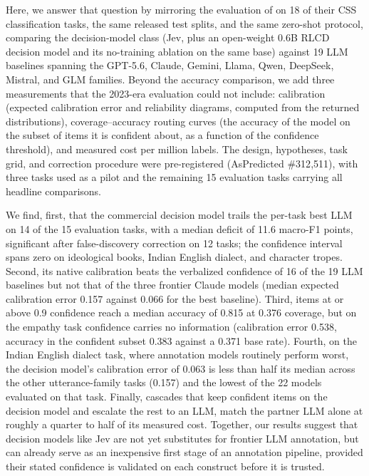 \documentclass[11pt]{article}
\begin{document}
Here, we answer that question by mirroring the evaluation of \citet{ziems2024llms} on 18 of their CSS classification tasks, the same released test splits, and the same zero-shot protocol, comparing the decision-model class (Jev, plus an open-weight 0.6B RLCD decision model and its no-training ablation on the same base) against 19 LLM baselines spanning the GPT-5.6, Claude, Gemini, Llama, Qwen, DeepSeek, Mistral, and GLM families. Beyond the accuracy comparison, we add three measurements that the 2023-era evaluation could not include: calibration (expected calibration error and reliability diagrams, computed from the returned distributions), coverage--accuracy routing curves (the accuracy of the model on the subset of items it is confident about, as a function of the confidence threshold), and measured cost per million labels. The design, hypotheses, task grid, and correction procedure were pre-registered (AsPredicted \#312{,}511), with three tasks used as a pilot and the remaining 15 evaluation tasks carrying all headline comparisons.

We find, first, that the commercial decision model trails the per-task best LLM on 14 of the 15 evaluation tasks, with a median deficit of 11.6 macro-F1 points, significant after false-discovery correction on 12 tasks; the confidence interval spans zero on ideological books, Indian English dialect, and character tropes. Second, its native calibration beats the verbalized confidence of 16 of the 19 LLM baselines but not that of the three frontier Claude models (median expected calibration error 0.157 against 0.066 for the best baseline). Third, items at or above 0.9 confidence reach a median accuracy of 0.815 at 0.376 coverage, but on the empathy task confidence carries no information (calibration error 0.538, accuracy in the confident subset 0.383 against a 0.371 base rate). Fourth, on the Indian English dialect task, where annotation models routinely perform worst, the decision model's calibration error of 0.063 is less than half its median across the other utterance-family tasks (0.157) and the lowest of the 22 models evaluated on that task. Finally, cascades that keep confident items on the decision model and escalate the rest to an LLM, match the partner LLM alone at roughly a quarter to half of its measured cost. Together, our results suggest that decision models like Jev are not yet substitutes for frontier LLM annotation, but can already serve as an inexpensive first stage of an annotation pipeline, provided their stated confidence is validated on each construct before it is trusted.
\end{document}
